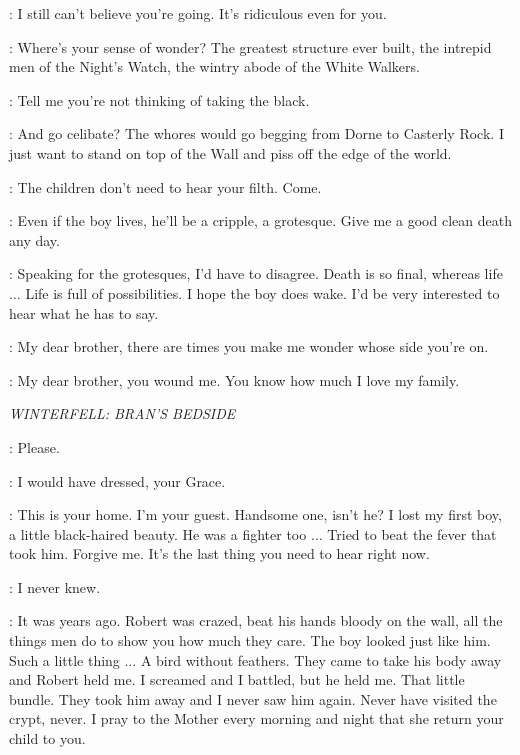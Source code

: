 \CERSEI: I still can't believe you're going. It's ridiculous even for you. 

\TYRION: Where's your sense of wonder? The greatest structure ever built, the intrepid men of the Night's Watch, the wintry abode of the White Walkers. 

\JAIME: Tell me you're not thinking of taking the black. 

\TYRION: And go celibate? The whores would go begging from Dorne to Casterly Rock. I just want to stand on top of the Wall and piss off the edge of the world. 

\CERSEI: The children don't need to hear your filth. Come. 

\JAIME: Even if the boy lives, he'll be a cripple, a grotesque. Give me a good clean death any day. 

\TYRION: Speaking for the grotesques, I'd have to disagree. Death is so final, whereas life $\ldots$ Life is full of possibilities. I hope the boy does wake. I'd be very interested to hear what he has to say. 

\JAIME: My dear brother, there are times you make me wonder whose side you're on. 

\TYRION: My dear brother, you wound me. You know how much I love my family. 

\scene

\textit{WINTERFELL: BRAN'S BEDSIDE}


\CERSEI: Please. 

\CATELYN: I would have dressed, your Grace. 

\CERSEI: This is your home. I'm your guest. Handsome one, isn't he? I lost my first boy, a little black-haired beauty. He was a fighter too $\ldots$ Tried to beat the fever that took him. Forgive me. It's the last thing you need to hear right now. 

\CATELYN: I never knew. 

\CERSEI: It was years ago. Robert was crazed, beat his hands bloody on the wall, all the things men do to show you how much they care. The boy looked just like him. Such a little thing $\ldots$ A bird without feathers. They came to take his body away and Robert held me. I screamed and I battled, but he held me. That little bundle. They took him away and I never saw him again. Never have visited the crypt, never. I pray to the Mother every morning and night that she return your child to you. 

